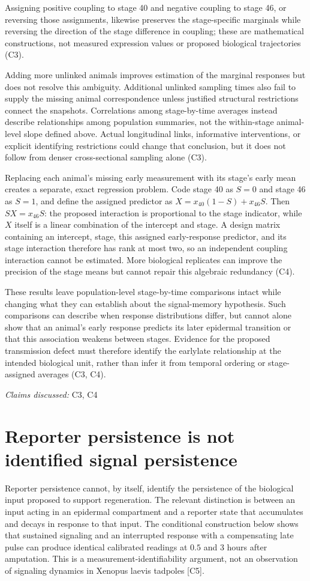 \documentclass[11pt]{article}
\begin{document}
Assigning positive coupling to stage 40 and negative coupling to stage 46, or reversing those assignments, likewise preserves the stage-specific marginals while reversing the direction of the stage difference in coupling; these are mathematical constructions, not measured expression values or proposed biological trajectories (C3).

Adding more unlinked animals improves estimation of the marginal responses but does not resolve this ambiguity. Additional unlinked sampling times also fail to supply the missing animal correspondence unless justified structural restrictions connect the snapshots. Correlations among stage-by-time averages instead describe relationships among population summaries, not the within-stage animal-level slope defined above. Actual longitudinal links, informative interventions, or explicit identifying restrictions could change that conclusion, but it does not follow from denser cross-sectional sampling alone (C3).

Replacing each animal\textquoteright{}s missing early measurement with its stage\textquoteright{}s early mean creates a separate, exact regression problem. Code stage 40 as $S=0$ and stage 46 as $S=1$, and define the assigned predictor as $X=x_{40}(1-S)+x_{46}S$. Then $SX=x_{46}S$: the proposed interaction is proportional to the stage indicator, while $X$ itself is a linear combination of the intercept and stage. A design matrix containing an intercept, stage, this assigned early-response predictor, and its stage interaction therefore has rank at most two, so an independent coupling interaction cannot be estimated. More biological replicates can improve the precision of the stage means but cannot repair this algebraic redundancy (C4).

These results leave population-level stage-by-time comparisons intact while changing what they can establish about the signal-memory hypothesis. Such comparisons can describe when response distributions differ, but cannot alone show that an animal\textquoteright{}s early response predicts its later epidermal transition or that this association weakens between stages. Evidence for the proposed transmission defect must therefore identify the early\textendash{}late relationship at the intended biological unit, rather than infer it from temporal ordering or stage-assigned averages (C3, C4).

\textit{Claims discussed: }C3, C4
\section{Reporter persistence is not identified signal persistence}
Reporter persistence cannot, by itself, identify the persistence of the biological input proposed to support regeneration. The relevant distinction is between an input acting in an epidermal compartment and a reporter state that accumulates and decays in response to that input. The conditional construction below shows that sustained signaling and an interrupted response with a compensating late pulse can produce identical calibrated readings at $0.5$ and $3$ hours after amputation. This is a measurement-identifiability argument, not an observation of signaling dynamics in Xenopus laevis tadpoles [C5].
\end{document}
